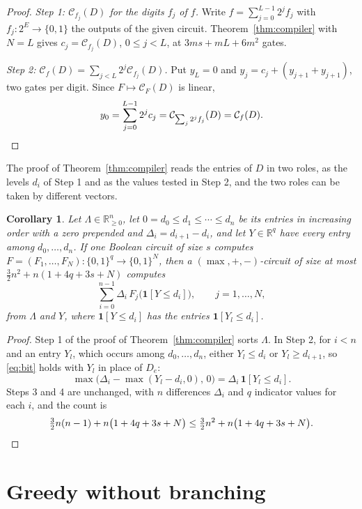 \documentclass[11pt]{article}
\newtheorem{corollary}[theorem]{Corollary}
\newcommand{\R}{\mathbb R}
\newcommand{\CC}{\mathcal C}
\begin{document}
\begin{proof}
\emph{Step 1: $\CC_{f_j}(D)$ for the digits $f_j$ of $f$.}  Write $f=\sum_{j=0}^{L-1}2^{j}f_j$ with
$f_j:2^{E}\to\{0,1\}$ the outputs of the given circuit.  Theorem~\ref{thm:compiler}
with $N=L$ gives $c_j=\CC_{f_j}(D)$, $0\le j<L$, at $3ms+mL+6m^{2}$ gates.

\emph{Step 2: $\CC_f(D)=\sum_{j<L}2^{j}\CC_{f_j}(D)$.}  Put $y_L=0$ and $y_j=c_j+(y_{j+1}+y_{j+1})$, two
gates per digit.  Since $F\mapsto\CC_F(D)$ is linear,
\[
  y_0=\sum_{j=0}^{L-1}2^{j}c_j=\CC_{\sum_j2^{j}f_j}(D)=\CC_f(D).\qedhere
\]
\end{proof}

The proof of Theorem~\ref{thm:compiler} reads the entries of $D$ in two roles, as
the levels $d_i$ of Step 1 and as the values tested in Step 2, and the two roles
can be taken by different vectors.

\begin{corollary}
\label{cor:levels}
Let $\Lambda\in\R^{n}_{\ge0}$, let $0=d_0\le d_1\le\cdots\le d_n$ be its entries in
increasing order with a zero prepended and $\Delta_i=d_{i+1}-d_i$, and let
$Y\in\R^{q}$ have every entry among $d_0,\ldots,d_n$.  If one Boolean circuit of
size $s$ computes $F=(F_1,\ldots,F_N):\{0,1\}^{q}\to\{0,1\}^{N}$, then a $(\max,+,-)$-circuit of size at most $\frac32n^{2}+n(1+4q+3s+N)$ computes
\[
  \sum_{i=0}^{n-1}\Delta_i\,F_j\bigl(\mathbf 1[Y\le d_i]\bigr),\qquad j=1,\ldots,N,
\]
from $\Lambda$ and $Y$, where $\mathbf 1[Y\le d_i]$ has the entries
$\mathbf 1[Y_l\le d_i]$.
\end{corollary}

\begin{proof}
Step 1 of the proof of Theorem~\ref{thm:compiler} sorts $\Lambda$.  In Step 2, for
$i<n$ and an entry $Y_l$, which occurs among $d_0,\ldots,d_n$, either $Y_l\le d_i$
or $Y_l\ge d_{i+1}$, so \eqref{eq:bit} holds with $Y_l$ in place of $D_e$:
\[
  \max\bigl(\Delta_i-\max(Y_l-d_i,0),\,0\bigr)=\Delta_i\,\mathbf 1[Y_l\le d_i].
\]
Steps 3 and 4 are unchanged, with $n$ differences $\Delta_i$ and $q$ indicator values for each $i$, and
the count is
\[
  \tfrac32n(n-1)+n\bigl(1+4q+3s+N\bigr)\le\tfrac32n^{2}+n\bigl(1+4q+3s+N\bigr).\qedhere
\]
\end{proof}

\section{Greedy without branching}
\label{sec:greedy}
\end{document}
